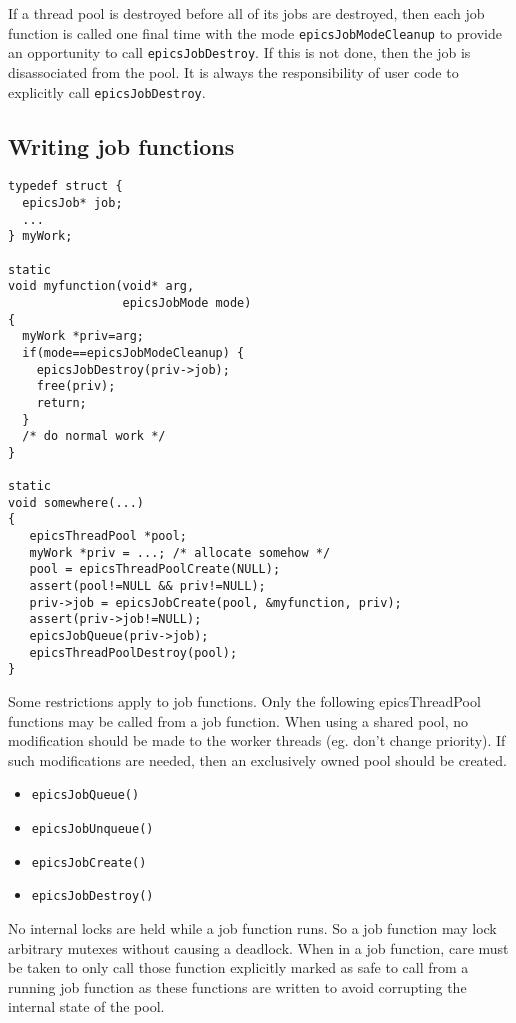 If a thread pool is destroyed before all of its jobs are destroyed,
then each job function is called one final time with the mode \verb|epicsJobModeCleanup|
to provide an opportunity to call \verb|epicsJobDestroy|.
If this is not done, then the job is disassociated from the pool.
It is always the responsibility of user code to explicitly call \verb|epicsJobDestroy|.

\subsection{Writing job functions}

\begin{verbatim}
typedef struct {
  epicsJob* job;
  ...
} myWork;

static
void myfunction(void* arg,
                epicsJobMode mode)
{
  myWork *priv=arg;
  if(mode==epicsJobModeCleanup) {
    epicsJobDestroy(priv->job);
    free(priv);
    return;
  }
  /* do normal work */
}

static
void somewhere(...)
{
   epicsThreadPool *pool;
   myWork *priv = ...; /* allocate somehow */
   pool = epicsThreadPoolCreate(NULL);
   assert(pool!=NULL && priv!=NULL);
   priv->job = epicsJobCreate(pool, &myfunction, priv);
   assert(priv->job!=NULL);
   epicsJobQueue(priv->job);
   epicsThreadPoolDestroy(pool);
}
\end{verbatim}


Some restrictions apply to job functions. Only the following epicsThreadPool
functions may be called from a job function. When using a shared pool,
no modification should be made to the worker threads (eg. don't change
priority). If such modifications are needed, then an exclusively owned
pool should be created.

\begin{itemize}
\item \verb|epicsJobQueue()|
\item \verb|epicsJobUnqueue()|
\item \verb|epicsJobCreate()|
\item \verb|epicsJobDestroy()|
\end{itemize}

No internal locks are held while a job function runs.
So a job function may lock arbitrary mutexes without causing a deadlock.
When in a job function, care must be taken to only call those function explicitly
marked as safe to call from a running job function as these functions
are written to avoid corrupting the internal state of the pool.


